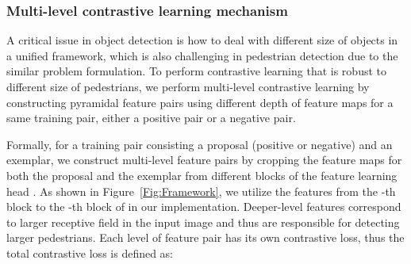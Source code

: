 \documentclass[journal]{IEEEtran}
\newcommand{\peicomment}[1]{\textcolor[rgb]{1,0,0} {#1}}
\begin{document}
\begin{comment}
\smallskip\noindent\textbf{Multi-scale contrastive learning mechanism.} We use the obtained exemplar dictionary to construct the training pairs for contrastive learning in a scale-adapted manner, including both positive pairs and negative pairs. Specifically, a positive training pair is constructed by a positive region proposal containing a pedestrian and an exemplar with the consistent scale of bounding box as the proposal, while a negative pair is constructed by a negative region proposal (with pure background) and an same-scale exemplar.
Such scale-adapted way of construction training data can potentially avoid the learning error resulted from the scale inconsistency between a proposal-exemplar pair.


 We perform depth-adapted feature extraction for contrastive learning to adapt to different size (scale) of pedestrian bounding boxes. As shown in Figure~\ref{Fig:Framework}, we extract input features for contrastive learning from shallow-depth layers of the feature learning head  for small size of proposals and exemplars, while extracting input features from deep-depth layers of  for large size of proposals and exemplars.
For instance, the representation  for a proposal  with small size of bounding box is obtained by:


Such depth-adapted feature extraction, together with the proposed scale-adapted construction of training data, allows performing multi-scale contrastive learning to deal with different size of pedestrian bounding boxes. \peicomment{need to be revised}
\end{comment}
\subsubsection{Multi-level contrastive learning mechanism}
A critical issue in object detection is how to deal with different size of objects in a unified framework, which is also challenging in pedestrian detection due to the similar problem formulation.  
To perform contrastive learning that is robust to different size of pedestrians, we perform multi-level contrastive learning by constructing pyramidal feature pairs using different depth of feature maps for a same training pair, either a positive pair or a negative pair. 

Formally, for a training pair consisting a proposal (positive or negative) and an exemplar, we construct multi-level feature pairs by cropping the feature maps for both the proposal and the exemplar from different blocks of the feature learning head . As shown in Figure~\ref{Fig:Framework}, we utilize the features from the -th block to the -th block of  in our implementation. Deeper-level features correspond to larger receptive field in the input image and thus are responsible for detecting larger pedestrians. 
Each level of feature pair has its own contrastive loss, thus the total contrastive loss is defined as:
\begin{comment}




\end{comment}
\end{document}
